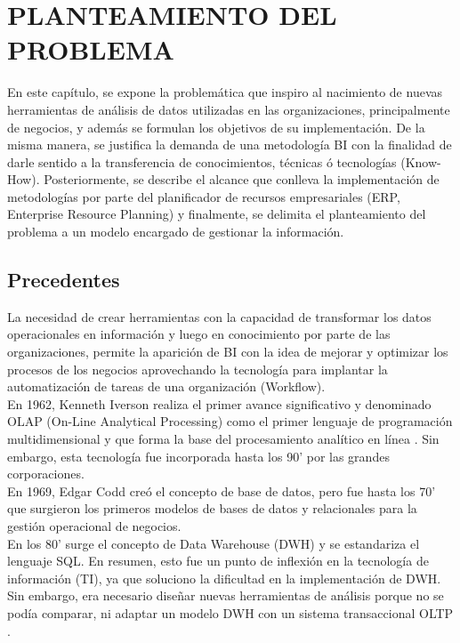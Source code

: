 \documentclass[11pt,titlepage]{report}
\begin{document}

\chapter{PLANTEAMIENTO DEL PROBLEMA} 

En este capítulo, se expone la problemática que inspiro al nacimiento de nuevas herramientas de análisis de datos utilizadas en las organizaciones, principalmente de negocios, y además se formulan los objetivos de su implementación. De la misma manera, se justifica la demanda de una metodología BI con la finalidad de darle sentido a la transferencia de conocimientos, técnicas ó tecnologías (Know-How). Posteriormente, se describe el alcance que conlleva la implementación de metodologías por parte del planificador de recursos empresariales (ERP, Enterprise Resource Planning) y finalmente, se delimita el planteamiento del problema a un modelo encargado de gestionar la información.


\section{Precedentes}
La necesidad de crear herramientas con la capacidad de transformar los datos operacionales en información y luego en conocimiento por parte de las organizaciones, permite la aparición de BI con la idea de mejorar y optimizar los procesos de los negocios aprovechando la tecnología para implantar la automatización de tareas de una organización (Workflow).\\

En 1962, Kenneth Iverson realiza el primer avance significativo y denominado OLAP (On-Line Analytical Processing) como el primer lenguaje de programación multidimensional y que forma la base del procesamiento analítico en línea \cite{web01}. Sin embargo, esta tecnología fue incorporada hasta los 90' por las grandes corporaciones.\\

En 1969, Edgar Codd creó el concepto de base de datos, pero fue hasta los 70' que surgieron los primeros modelos de bases de datos y relacionales para la gestión operacional de negocios.\\

En los 80' surge el concepto de Data Warehouse (DWH) y se estandariza el lenguaje SQL. En resumen, esto fue un punto de inflexión en la tecnología de información (TI), ya que soluciono la dificultad en la implementación de DWH. Sin embargo, era necesario diseñar nuevas herramientas de análisis porque no se podía comparar, ni adaptar un modelo DWH con un sistema transaccional OLTP \cite{tes01}.\\
\end{document}
